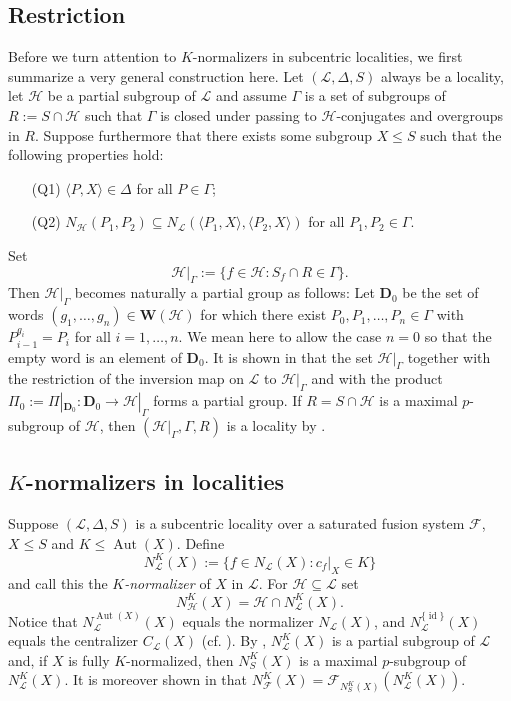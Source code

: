 \documentclass[reqno,11pt]{amsart}
\numberwithin{equation}{section}
\theoremstyle{definition}
\newcommand{\F}{\mathcal{F}}
\renewcommand{\L}{\mathcal{L}}
\newcommand{\D}{\mathbf{D}}
\renewcommand{\H}{\mathcal{H}}
\newcommand{\Aut}{\operatorname{Aut}}
\newcommand{\id}{\operatorname{id}}
\newcommand{\W}{\mathbf{W}}
\def \<{\langle }
\def \>{\rangle }
\begin{document}
\subsection{Restriction} \label{SS:Restrictions} Before we turn attention to $K$-normalizers in subcentric localities, we first summarize a very general construction here. Let $(\L,\Delta,S)$ always be a locality, let $\H$ be a partial subgroup of $\L$ and assume $\Gamma$ is a set of subgroups of $R:=S\cap\H$ such that $\Gamma$ is closed under passing to  $\H$-conjugates and overgroups in $R$. Suppose furthermore that there exists some subgroup $X\leq S$ such that the following properties hold:
\begin{itemize}
 \item [(Q1)] $\<P,X\>\in\Delta$ for all $P\in\Gamma$;
 \item [(Q2)] $N_\H(P_1,P_2)\subseteq N_\L(\<P_1,X\>,\<P_2,X\>)$ for all $P_1,P_2\in\Gamma$.  
\end{itemize}
Set
\[\H|_\Gamma:=\{f\in\H\colon S_f\cap R\in\Gamma\}.\]
Then $\H|_\Gamma$ becomes naturally a partial group as follows: Let $\D_0$ be the set of words $(g_1,\dots,g_n)\in\W(\H)$ for which there exist $P_0,P_1,\dots,P_n\in\Gamma$ with $P_{i-1}^{g_i}=P_i$ for all $i=1,\dots,n$. We mean here to allow the case $n=0$ so that the empty word is an element of $\D_0$. It is shown in \cite[Lemma~9.6]{Henke:2015} that the set $\H|_\Gamma$ together with the restriction of the inversion map on $\L$ to $\H|_\Gamma$ and with the product $\Pi_0:=\Pi|_{\D_0}\colon \D_0\rightarrow \H|_\Gamma$ forms a partial group. If $R=S\cap\H$ is a maximal $p$-subgroup of $\H$, then $(\H|_\Gamma,\Gamma,R)$ is a locality by \cite[Lemma~9.8]{Henke:2015}. 




\subsection{$K$-normalizers in localities}

Suppose $(\L,\Delta,S)$ is a subcentric locality over a saturated fusion system $\F$, $X\leq S$ and $K\leq \Aut(X)$. Define
\[N_\L^K(X):=\{f\in N_\L(X)\colon c_f|_X\in K\}\] 
and call this the \emph{$K$-normalizer} of $X$ in $\L$. For $\H\subseteq\L$ set
\[N_\H^K(X)=\H\cap N_\L^K(X).\]
Notice that $N_\L^{\Aut(X)}(X)$ equals the normalizer $N_\L(X)$, and $N_\L^{\{\id\}}(X)$ equals the centralizer $C_\L(X)$ (cf. \cite[Definition~4.4]{Henke:Regular}). By \cite[Lemma~9.10]{Henke:2015}, $N_\L^K(X)$ is a partial subgroup of $\L$ and, if $X$ is fully $K$-normalized, then $N_S^K(X)$ is a maximal $p$-subgroup of $N_\L^K(X)$. It is moreover shown in \cite[Lemma~9.12]{Henke:2015} that $N_\F^K(X)=\F_{N_S^K(X)}(N_\L^K(X))$. 
\end{document}
